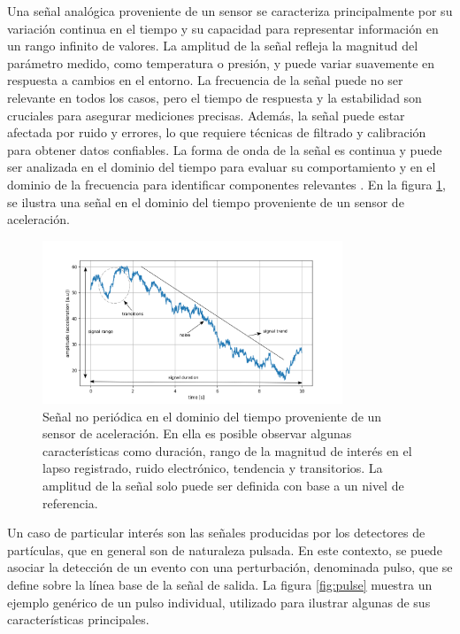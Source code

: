 \documentclass[]{book}
\begin{document}
\noindent Una señal analógica proveniente de un sensor se caracteriza principalmente por su variación continua en el tiempo y su capacidad para representar información en un rango infinito de valores. La amplitud de la señal refleja la magnitud del parámetro medido, como temperatura o presión, y puede variar suavemente en respuesta a cambios en el entorno. La frecuencia de la señal puede no ser relevante en todos los casos, pero el tiempo de respuesta y la estabilidad son cruciales para asegurar mediciones precisas. Además, la señal puede estar afectada por ruido y errores, lo que requiere técnicas de filtrado y calibración para obtener datos confiables. La forma de onda de la señal es continua y puede ser analizada en el dominio del tiempo para evaluar su comportamiento y en el dominio de la frecuencia para identificar componentes relevantes \cite{sinclair2000sensors}. En la figura \ref{fig:generic_signal}, se ilustra una señal en el dominio del tiempo proveniente de un sensor de aceleración.\\

\begin{figure}[h]
    \centering
    \includegraphics[width=0.8\textwidth]{mysignal.png}
    \caption{Señal no periódica en el dominio del tiempo proveniente de un sensor de aceleración. En ella es posible observar algunas características como duración, rango de la magnitud de interés en el lapso registrado, ruido electrónico, tendencia y transitorios. La amplitud de la señal solo puede ser definida con base a un nivel de referencia.}
    \label{fig:generic_signal}

\end{figure}

\noindent Un caso de particular interés son las señales producidas por los detectores de partículas, que en general son de naturaleza pulsada. En este contexto, se puede asociar la detección de un evento con una perturbación, denominada pulso, que se define sobre la línea base de la señal de salida. La figura \ref{fig:pulse} muestra un ejemplo genérico de un pulso individual, utilizado para ilustrar algunas de sus características principales.
\end{document}
